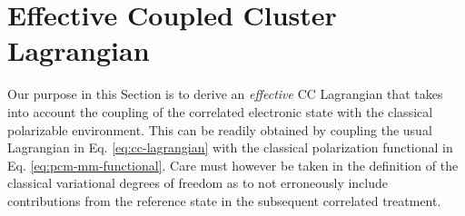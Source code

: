 \section{Effective Coupled Cluster Lagrangian}
\label{sec:effective-cc-lagrangian}

Our purpose in this Section is to derive an \emph{effective} \acrshort{CC}
Lagrangian that takes into account the coupling of the correlated
electronic state with the classical polarizable
environment.
This can be readily obtained\autocite{Lipparini2016-mo} by coupling the
usual Lagrangian in Eq. \eqref{eq:cc-lagrangian} with the classical
polarization functional in Eq. \eqref{eq:pcm-mm-functional}.
Care must however be taken in the definition of the classical
variational degrees of freedom as to not erroneously include
contributions from the reference state in the subsequent correlated
treatment.

